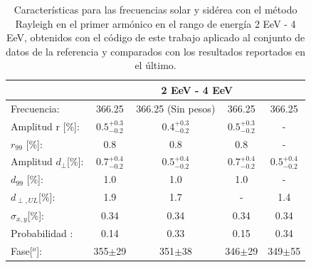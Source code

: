 \begin{table}[H]
    \begin{small}
        \begin{center}
            \begin{tabular}[c]{l|c|c|c|c|}
                                            & \multicolumn{4}{|c|}{2 EeV - 4 EeV}                                                               \\ \hline
                Frecuencia:                 & 366.25              & 366.25 (Sin pesos)  & 366.25 \cite{codigo}    & 366.25 \cite{Aab_2020}   \\ \hline
                Amplitud r [\%]:            & $0.5^{+0.3}_{-0.2}$ & $0.4^{+0.3}_{-0.2}$ & $0.5^{+0.3}_{-0.2}$     & -                          \\
                $r_{99}$ [\%]:              & 0.8                 & 0.8                 & 0.8                     & -                          \\\hline
                Amplitud $d_\perp$[\%]:     & $0.7^{+0.4}_{-0.2}$ & $0.5^{+0.4}_{-0.2}$ & $0.7^{+0.4}_{-0.2}$ 	  & $0.5^{+0.4}_{-0.2}$                    \\
                $d_{99}$ [\%]:              & 1.0                 & 1.0                 & 1.0                     & -                         \\
                $d_{\perp,UL}$[\%]:         & 1.9                 & 1.7                 & -                       & 1.4                               \\\hline
                $\sigma_{x,y}$[\%]:         & 0.34	              & 0.34	            & 0.34	                  & 0.34                           \\
                Probabilidad      :         & 0.14                & 0.33                & 0.15               	  & 0.34                       \\
                Fase[$^o$]:                 & 355$\pm$29          & 351$\pm$38          & 346$\pm$29              & 349$\pm$55                    \\
            \end{tabular}
        \end{center}
    \end{small}
    \caption{Características para las frecuencias solar y sidérea con el método Rayleigh en el primer armónico en el rango de energía 2 EeV - 4 EeV, obtenidos con el código de este trabajo aplicado al conjunto de datos de la referencia \cite{Aab_2020} y comparados con los resultados reportados en el último.}
\end{table}



